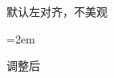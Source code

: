 \documentclass{ctexart}
\begin{document}
\begin{compactenum}[1.]
\setcounter{enumi}{8}
    \item 
    \item 
    \item 默认左对齐，不美观
    \end{compactenum}

    \mbox{} \hfill \hfill \mbox{} 

\begin{compactenum}[1.]=2em
    \setcounter{enumi}{8}
    \item 
    \item 
    \item 调整后
    \end{compactenum}
\end{document}

